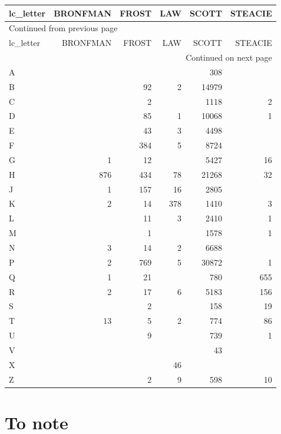 \documentclass[11pt]{article}
\begin{document}
\begin{longtable}{lrrrrr}
lc\_letter & BRONFMAN & FROST & LAW & SCOTT & STEACIE\\
\hline
\endfirsthead
\multicolumn{6}{l}{Continued from previous page} \\
\hline

lc\_letter & BRONFMAN & FROST & LAW & SCOTT & STEACIE \\

\hline
\endhead
\hline\multicolumn{6}{r}{Continued on next page} \\
\endfoot
\endlastfoot
\hline
A &  &  &  & 308 & \\
B &  & 92 & 2 & 14979 & \\
C &  & 2 &  & 1118 & 2\\
D &  & 85 & 1 & 10068 & 1\\
E &  & 43 & 3 & 4498 & \\
F &  & 384 & 5 & 8724 & \\
G & 1 & 12 &  & 5427 & 16\\
H & 876 & 434 & 78 & 21268 & 32\\
J & 1 & 157 & 16 & 2805 & \\
K & 2 & 14 & 378 & 1410 & 3\\
L &  & 11 & 3 & 2410 & 1\\
M &  & 1 &  & 1578 & 1\\
N & 3 & 14 & 2 & 6688 & \\
P & 2 & 769 & 5 & 30872 & 1\\
Q & 1 & 21 &  & 780 & 655\\
R & 2 & 17 & 6 & 5183 & 156\\
S &  & 2 &  & 158 & 19\\
T & 13 & 5 & 2 & 774 & 86\\
U &  & 9 &  & 739 & 1\\
V &  &  &  & 43 & \\
X &  &  & 46 &  & \\
Z &  & 2 & 9 & 598 & 10\\
\end{longtable}


\section*{To note}
\label{sec:org18f449f}
\end{document}
